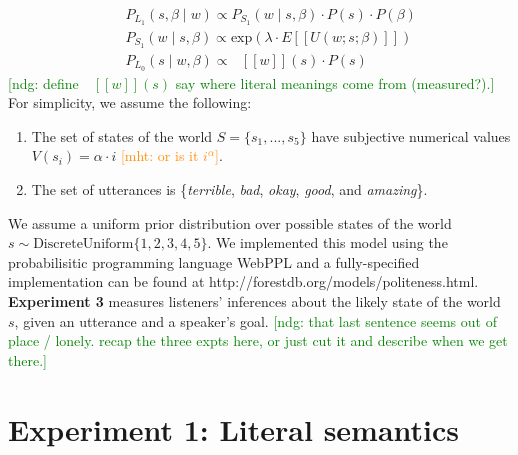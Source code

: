 \documentclass[10pt,letterpaper]{article}
\newcommand{\denote}[1]{\mbox{ $[\![ #1 ]\!]$}}
\newcommand{\ndg}[1]{\textcolor{Green}{[ndg: #1]}}
\newcommand{\mht}[1]{\textcolor{DarkOrange}{[mht: #1]}}
\newcommand{\ejy}[1]{\textcolor{Blue}{[ejy: #1]}}
\begin{document}
%
\begin{eqnarray}
&&P_{L_1}(s, \beta \mid w)\propto P_{S_1}(w \mid s, \beta)\cdot P(s) \cdot P(\beta) \label{eq:L1}\\
&&P_{S_1}(w \mid s, \beta) \propto \mathrm{exp}(\lambda \cdot E[[U(w; s; \beta)]])\label{eq:S1}\\
&&P_{L_0}(s \mid w, \beta)\propto \denote{w}(s) \cdot P(s) \label{eq:L0}
\end{eqnarray}
%
\ndg{define $ \denote{w}(s)$ say where literal meanings come from (measured?).}
For simplicity, we assume the following:
\begin{enumerate}
\item The set of states of the world $S = \{s_{1}, ...,  s_{5}\}$ have subjective numerical values $V(s_{i}) = \alpha \cdot i$ \mht{or is it $i^\alpha$}. 
\item The set of utterances is \{\emph{terrible}, \emph{bad}, \emph{okay}, \emph{good}, and \emph{amazing}\}.
\end{enumerate}

We assume a uniform prior distribution over possible states of the world $s\sim \text{DiscreteUniform} \{1, 2, 3, 4, 5\}$. 
We implemented this model using the probabilisitic programming language WebPPL \cite{dippl} and a fully-specified implementation can be found at http://forestdb.org/models/politeness.html.
\textbf{Experiment 3} measures listeners' inferences about the likely state of the world $s$, given an utterance and a speaker's goal. 
\ndg{that last sentence seems out of place / lonely. recap the three expts here, or just cut it and describe when we get there.}

%


\section{Experiment 1: Literal semantics}
\end{document}
